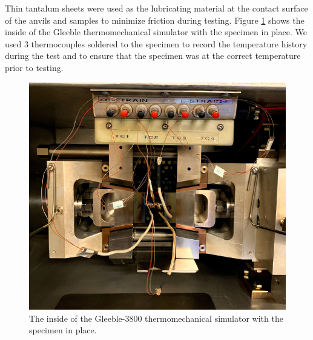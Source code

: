 \documentclass[metals,article,accept,pdftex,moreauthors]{Definitions/mdpi}
\begin{document}
Thin tantalum sheets were used as the lubricating material at the contact surface of the anvils and samples to minimize friction during testing.
Figure \ref{fig:Inside-Gleeble3800} shows the inside of the Gleeble thermomechanical simulator with the specimen in place. We used 3 thermocouples soldered to the specimen to record the temperature history during the test and to ensure that the specimen was at the correct temperature prior to testing.
\begin{figure}[H]

\includegraphics[width=0.7\columnwidth]{Figures/Gleeble-1}
\caption{The inside of the Gleeble-3800 thermomechanical simulator with the specimen in place.}
\label{fig:Inside-Gleeble3800}
\end{figure}
\end{document}
